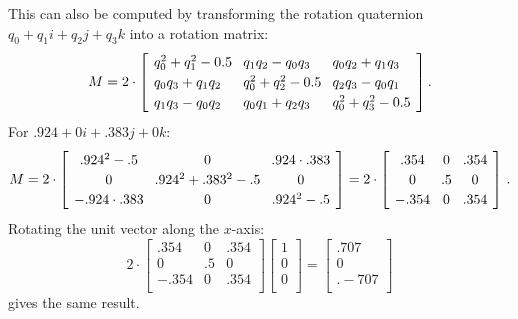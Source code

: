 \documentclass[11pt,a4paper]{report}
\newcommand*{\spacearray}{
\renewcommand{\arraystretch}{1.2}
\setlength{\arraycolsep}{4pt}
}
\begin{document}
This can also be computed by transforming the rotation quaternion $q_0+q_1i+q_2j+q_3k$ into a rotation matrix:
\begin{displaymath}
\spacearray
M=
2\cdot\left[
\begin{array}{lll}
q_0^2+q_1^2-0.5 & q_1q_2-q_0q_3 & q_0q_2+q_1q_3\\
q_0q_3+q_1q_2 & q_0^2+q_2^2-0.5 & q_2q_3-q_0q_1\\
q_1q_3-q_0q_2 & q_0q_1+q_2q_3 & q_0^2+q_3^2-0.5\\
\end{array}
\right].
\end{displaymath}
For $.924+0i+.383j+0k$:
\begin{displaymath}
\spacearray
M=
2\cdot\left[
\begin{array}{ccc}
.924^2-.5 & 0 & .924\cdot .383\\
0& .924^2+.383^2-.5 & 0\\
-.924\cdot .383 & 0 & .924^2-.5\\
\end{array}
\right]=
2\cdot\left[
\begin{array}{ccc}
.354 & 0 & .354\\
0& .5 & 0\\
-.354 & 0 & .354\\
\end{array}
\right]\,.
\end{displaymath}
Rotating the unit vector along the $x$-axis:
\[
2\cdot\left[
\begin{array}{ccc}
.354 & 0 & .354\\
0& .5 & 0\\
-.354 & 0 & .354\\
\end{array}
\right]
\left[
\begin{array}{c}1\\0\\0\\\end{array}
\right]=
\left[
\begin{array}{c}.707\\0\\.-707\\\end{array}
\right]
\]
gives the same result.
\end{document}
